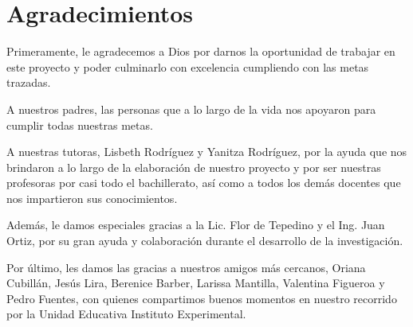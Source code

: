 {\setlength{\parskip}{-0.5cm}
\chapter*{Agradecimientos} 

Primeramente, le agradecemos a Dios por darnos la oportunidad de trabajar en este proyecto y poder culminarlo con excelencia cumpliendo con las metas trazadas.
}

A nuestros padres, las personas que a lo largo de la vida nos apoyaron para cumplir todas nuestras metas. 

A nuestras tutoras, Lisbeth Rodríguez y Yanitza Rodríguez, por la ayuda que nos brindaron a lo largo de la elaboración de nuestro proyecto y por ser nuestras profesoras por casi todo el bachillerato, así como a todos los demás docentes que nos impartieron sus conocimientos.

Además, le damos especiales gracias a la Lic. Flor de Tepedino y el Ing. Juan Ortiz, por su gran ayuda y colaboración durante el desarrollo de la investigación.

Por último, les damos las gracias a nuestros amigos más cercanos, Oriana Cubillán, Jesús Lira, Berenice Barber, Larissa Mantilla, Valentina Figueroa y Pedro Fuentes, con quienes compartimos buenos momentos en nuestro recorrido por la Unidad Educativa Instituto Experimental.

\newpage